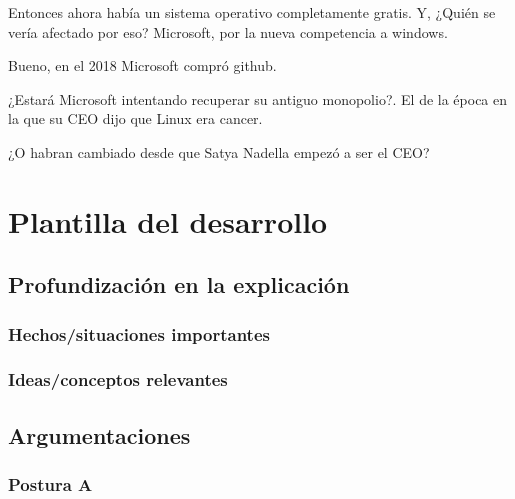 \documentclass[12pt, twoside]{article}
\begin{document}
Entonces ahora había un sistema operativo completamente gratis.
Y, ¿Quién se vería afectado por eso?
Microsoft, por la nueva competencia a windows. \citet{HALLO1}

Bueno, en el 2018 Microsoft compró github. \citet{GITHUB}

¿Estará Microsoft intentando recuperar su antiguo monopolio?.
El de la época en la que su CEO dijo que Linux era cancer. \citet{CANCER}

¿O habran cambiado desde que Satya Nadella empezó a ser el CEO?
\iffalse
\section{Plantilla del desarrollo}%

\subsection{Profundización en la explicación}%

\subsubsection{Hechos/situaciones importantes}%

\subsubsection{Ideas/conceptos relevantes}%


\subsection{Argumentaciones}%

\subsubsection{Postura A}%
\end{document}
